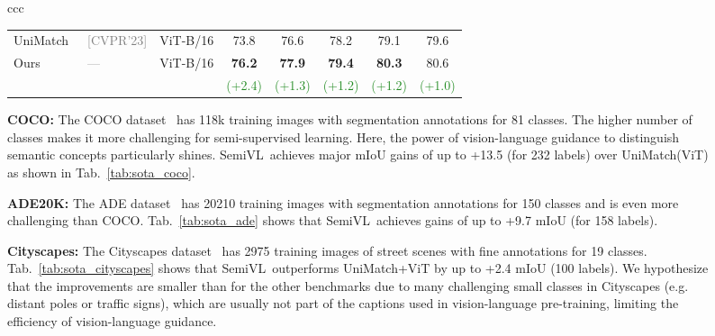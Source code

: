 \documentclass[10pt,twocolumn,letterpaper]{article}
\newcommand{\ours}{SemiVL}
\newcommand{\green}[1]{\textcolor{ForestGreen}{#1}}
\newcommand{\venue}[1]{{\tiny\textcolor{gray}{[#1]}}}
\begin{document}
\begin{figure*}
\begin{tabular}{ccc}
\begin{table}
\begin{tabular}{lllccccc}
\midrule
UniMatch~\cite{yang2023revisiting} &                        \venue{CVPR'23} &                  ViT-B/16 & 73.8 &          76.6 &           78.2 &           79.1 &           79.6 \\
                       \multirow{2}{*}{Ours} & \multirow{2}{*}{\textcolor{gray}{---}} & \multirow{2}{*}{ViT-B/16} & \textbf{76.2} &           \textbf{77.9} &           \textbf{79.4} &           \textbf{80.3} &           80.6 \\
                                             &                                        &                           & \green{(+2.4)} & \green{(+1.3)} & \green{(+1.2)} & \green{(+1.2)} & \green{(+1.0)} \\

\bottomrule
\end{tabular}
\end{table} 
\noindent\textbf{COCO:} The COCO dataset~\cite{caesar2018coco} has 118k training images with segmentation annotations for 81 classes. The higher number of classes makes it more challenging for semi-supervised learning. Here, the power of vision-language guidance to distinguish semantic concepts particularly shines. \ours\ achieves major mIoU gains of up to +13.5 (for 232 labels) over UniMatch(ViT) as shown in Tab.~\ref{tab:sota_coco}. 

\noindent\textbf{ADE20K:} The ADE dataset~\cite{zhou2017scene} has 20210 training images with segmentation annotations for 150 classes and is even more challenging than COCO. Tab.~\ref{tab:sota_ade} shows that \ours\ achieves gains of up to +9.7 mIoU (for 158 labels).

\noindent\textbf{Cityscapes:} The Cityscapes dataset~\cite{cordts2016cityscapes} has 2975 training images of street scenes with fine annotations for 19 classes. Tab.~\ref{tab:sota_cityscapes} shows that \ours\ outperforms UniMatch+ViT by up to +2.4 mIoU (100 labels). We hypothesize that the improvements are smaller than for the other benchmarks due to many challenging small classes in Cityscapes (e.g. distant poles or traffic signs), which are usually not part of the captions used in vision-language pre-training, limiting the efficiency of vision-language guidance.


\end{tabular}
\end{figure*}
\end{document}
